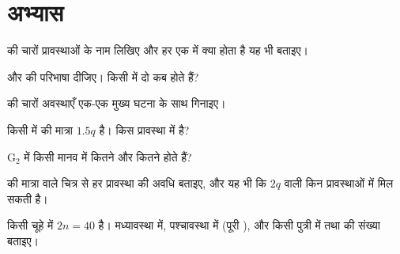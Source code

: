 \section{अभ्यास}

\begin{exercise}[$\star$]\label{exo:g11:cell-cycle-mitosis:1}
 की चारों प्रावस्थाओं के नाम लिखिए और हर एक में क्या होता है
यह भी बताइए।
\end{exercise}

\begin{exercise}[$\star$]\label{exo:g11:cell-cycle-mitosis:2}
 और  की परिभाषा दीजिए। किसी  में दो 
कब होते हैं?
\end{exercise}

\begin{exercise}[$\star$]\label{exo:g11:cell-cycle-mitosis:3}
 की चारों अवस्थाएँ एक-एक मुख्य घटना के साथ गिनाइए।
\end{exercise}

\begin{exercise}[$\star$]\label{exo:g11:cell-cycle-mitosis:4}
किसी  में  की मात्रा $1.5q$ है।  किस प्रावस्था में है?
\end{exercise}

\begin{exercise}[$\star$]\label{exo:g11:cell-cycle-mitosis:5}
$\mathrm{G_2}$ में किसी मानव  में कितने  और कितने 
होते हैं?
\end{exercise}

\begin{exercise}[$\star\star$]\label{exo:g11:cell-cycle-mitosis:6}
 की मात्रा वाले चित्र से हर प्रावस्था की अवधि बताइए, और यह भी कि $2q$
वाली  किन प्रावस्थाओं में मिल सकती है।
\end{exercise}

\begin{exercise}[$\star\star$]\label{exo:g11:cell-cycle-mitosis:7}
किसी चूहे में $2n = 40$ है। मध्यावस्था में, पश्चावस्था में (पूरी ),
और किसी पुत्री  में  तथा  की संख्या बताइए।
\end{exercise}

